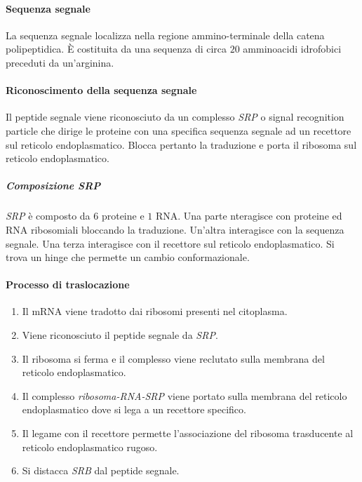 			\paragraph{Sequenza segnale}
			La sequenza segnale localizza nella regione ammino-terminale della catena polipeptidica.
			\`E costituita da una sequenza di circa $20$ amminoacidi idrofobici preceduti da un'arginina.
			
			\paragraph{Riconoscimento della sequenza segnale}
			Il peptide segnale viene riconosciuto da un complesso \emph{SRP} o signal recognition particle che dirige le proteine con una specifica sequenza segnale ad un recettore sul reticolo endoplasmatico.
			Blocca pertanto la traduzione e porta il ribosoma sul reticolo endoplasmatico.

				\subparagraph{Composizione \emph{SRP}}
				\emph{SRP} \`e composto da $6$ proteine e $1$ RNA\@.
				Una parte nteragisce con proteine ed RNA ribosomiali bloccando la traduzione.
				Un'altra interagisce con la sequenza segnale.
				Una terza interagisce con il recettore sul reticolo endoplasmatico.
				Si trova un hinge che permette un cambio conformazionale.

			\paragraph{Processo di traslocazione}
			\begin{multicols}{2}
				\begin{enumerate}
					\item Il mRNA viene tradotto dai ribosomi presenti nel citoplasma.
					\item Viene riconosciuto il peptide segnale da \emph{SRP}.
					\item Il ribosoma si ferma e il complesso viene reclutato sulla membrana del reticolo endoplasmatico.
					\item Il complesso \emph{ribosoma-RNA-SRP} viene portato sulla membrana del reticolo endoplasmatico dove si lega a un recettore specifico.
					\item Il legame con il recettore permette l'associazione del ribosoma trasducente al reticolo endoplasmatico rugoso.
					\item Si distacca \emph{SRB} dal peptide segnale.
				\end{enumerate}
			\end{multicols}

